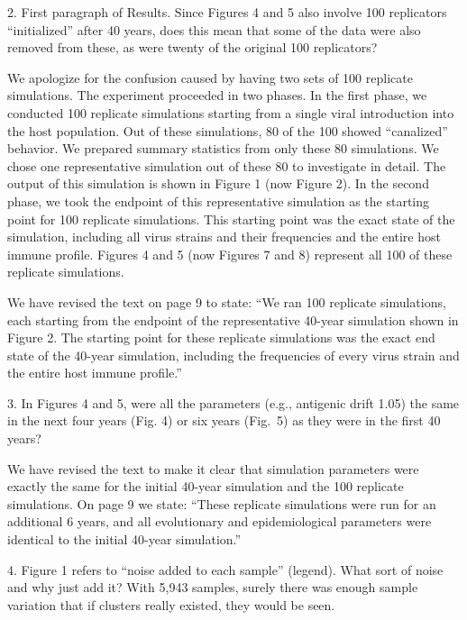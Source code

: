 \documentclass[11pt,oneside,letterpaper]{article}
\def\comment#1{
#1
}
\def\response#1{
\begin{bf}
#1
\end{bf}
}
\def\break{\vspace{0.2cm}}
\begin{document}
\break

\comment{2. First paragraph of Results. Since Figures 4 and 5 also involve 100 replicators ``initialized'' after 40 years, does this mean that some of the data were also removed from these, as were twenty of the original 100 replicators?}

\response{We apologize for the confusion caused by having two sets of 100 replicate simulations.  The experiment proceeded in two phases.  In the first phase, we conducted 100 replicate simulations starting from a single viral introduction into the host population.  Out of these simulations, 80 of the 100 showed ``canalized'' behavior.  We prepared summary statistics from only these 80 simulations.  We chose one representative simulation out of these 80 to investigate in detail.  The output of this simulation is shown in Figure 1 (now Figure 2).  In the second phase, we took the endpoint of this representative simulation as the starting point for 100 replicate simulations.  This starting point was the exact state of the simulation, including all virus strains and their frequencies and the entire host immune profile.  Figures 4 and 5 (now Figures 7 and 8) represent all 100 of these replicate simulations.}

\response{We have revised the text on page 9 to state: ``We ran 100 replicate simulations, each starting from the endpoint of the representative 40-year simulation shown in Figure 2.  The starting point for these replicate simulations was the exact end state of the 40-year simulation, including the frequencies of every virus strain and the entire host immune profile.''}

\break

\comment{3. In Figures 4 and 5, were all the parameters (e.g., antigenic drift 1.05) the same in the next four years (Fig. 4) or six years (Fig.\ 5) as they were in the first 40 years?}

\response{We have revised the text to make it clear that simulation parameters were exactly the same for the initial 40-year simulation and the 100 replicate simulations.  On page 9 we state: ``These replicate simulations were run for an additional 6 years, and all evolutionary and epidemiological parameters were identical to the initial 40-year simulation.''}

\comment{4. Figure 1 refers to ``noise added to each sample'' (legend). What sort of noise and why just add it? With 5,943 samples, surely there was enough sample variation that if clusters really existed, they would be seen.}
\end{document}
